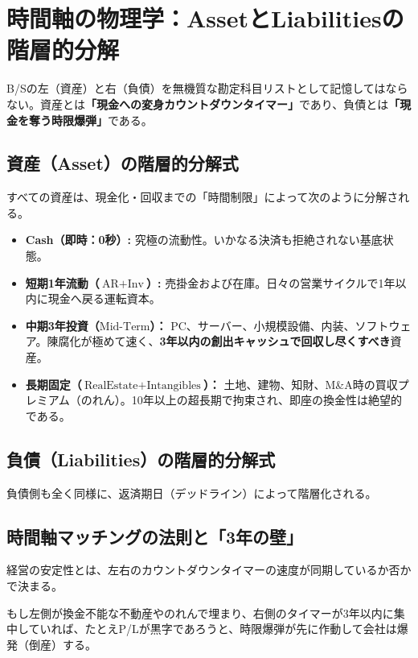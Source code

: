 \ifja
\chapter{時間軸の物理学：AssetとLiabilitiesの階層的分解}
\label{chap:time_horizon}

B/Sの左（資産）と右（負債）を無機質な勘定科目リストとして記憶してはならない。資産とは\textbf{「現金への変身カウントダウンタイマー」}であり、負債とは\textbf{「現金を奪う時限爆弾」}である。

\section{資産（Asset）の階層的分解式}
すべての資産は、現金化・回収までの「時間制限」によって次のように分解される。



\begin{itemize}
    \item \textbf{Cash（即時：0秒）:} 究極の流動性。いかなる決済も拒絶されない基底状態。
    \item \textbf{短期1年流動（$\text{AR} + \text{Inv}$）:} 売掛金および在庫。日々の営業サイクルで1年以内に現金へ戻る運転資本。
    \item \textbf{中期3年投資（$\text{Mid-Term}$）：} PC、サーバー、小規模設備、内装、ソフトウェア。陳腐化が極めて速く、\textbf{3年以内の創出キャッシュで回収し尽くすべき}資産。
    \item \textbf{長期固定（$\text{RealEstate} + \text{Intangibles}$）：} 土地、建物、知財、M\&A時の買収プレミアム（のれん）。10年以上の超長期で拘束され、即座の換金性は絶望的である。
\end{itemize}

\section{負債（Liabilities）の階層的分解式}
負債側も全く同様に、返済期日（デッドライン）によって階層化される。

\section{時間軸マッチングの法則と「3年の壁」}
経営の安定性とは、左右のカウントダウンタイマーの速度が同期しているか否かで決まる。

もし左側が換金不能な不動産やのれんで埋まり、右側のタイマーが3年以内に集中していれば、たとえP/Lが黒字であろうと、時限爆弾が先に作動して会社は爆発（倒産）する。

